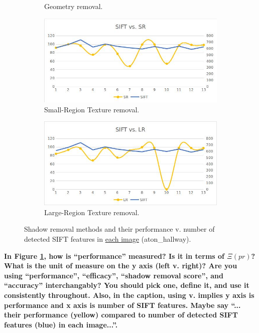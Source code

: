 \documentclass[12pt]{report}
\newcommand{\comment}[1]
           {\par {\bfseries \color{blue} #1 \par}}
\begin{document}
\begin{figure}
\begin{subfigure}{.49\linewidth}
  \caption{Geometry removal.}
\end{subfigure}
\hfill
\begin{subfigure}{.49\linewidth}
 \includegraphics[width=1\linewidth]{figures/selectinganalgorithm_srt.jpg}
  \caption{Small-Region Texture removal.}
\end{subfigure}
\hfill
\begin{subfigure}{.49\linewidth}
 \includegraphics[width=1\linewidth]{figures/selectinganalgorithm_lrt.jpg}
  \caption{Large-Region Texture removal.}
\end{subfigure}

\caption{Shadow removal methods and their performance v. number of detected SIFT features in \underline{each image} (aton\_hallway).}
\label{fig:selectinganalgorithm}
\end{figure}
\comment{In Figure \ref{fig:selectinganalgorithm}, how is ``performance'' measured?  Is it in terms of $\Xi(pr)$?  What is the unit of measure on the y axis (left v. right)? Are you using ``performance'', ``efficacy'', ``shadow removal score'', and ``accuracy'' interchangably?  You should pick one, define it, and use it consistently throughout.  Also, in the caption, using v. implies y axis is performance and x axis is number of SIFT features.  Maybe say ``... their performance (yellow) compared to number of detected SIFT features (blue) in each image...''.}
\end{document}

